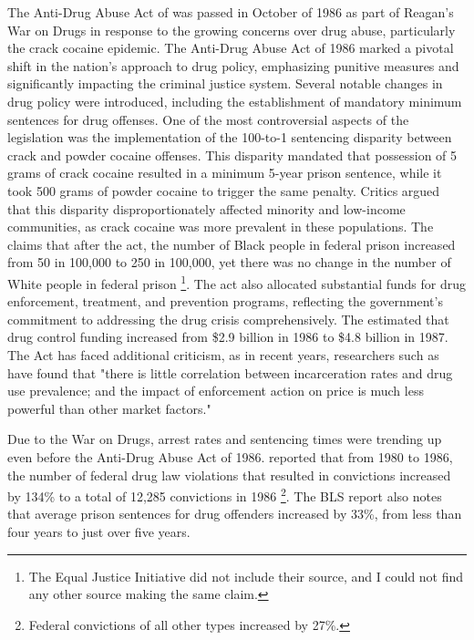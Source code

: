 \documentclass{article}
\begin{document}
The Anti-Drug Abuse Act of \citeyear{antidrugabuseact1986} was passed in October of 1986 as part of Reagan's War on Drugs in response to the growing concerns over drug abuse, particularly the crack cocaine epidemic. The Anti-Drug Abuse Act of 1986 marked a pivotal shift in the nation's approach to drug policy, emphasizing punitive measures and significantly impacting the criminal justice system. Several notable changes in drug policy were introduced, including the establishment of mandatory minimum sentences for drug offenses. One of the most controversial aspects of the legislation was the implementation of the 100-to-1 sentencing disparity between crack and powder cocaine offenses. This disparity mandated that possession of 5 grams of crack cocaine resulted in a minimum 5-year prison sentence, while it took 500 grams of powder cocaine to trigger the same penalty. Critics argued that this disparity disproportionately affected minority and low-income communities, as crack cocaine was more prevalent in these populations. The \cite{eji} claims that after the act, the number of Black people in federal prison increased from 50 in 100,000 to 250 in 100,000, yet there was no change in the number of White people in federal prison \footnote{The Equal Justice Initiative did not include their source, and I could not find any other source making the same claim.}. The act also allocated substantial funds for drug enforcement, treatment, and prevention programs, reflecting the government's commitment to addressing the drug crisis comprehensively. The \cite{drug_control_money} estimated that drug control funding increased from \$2.9 billion in 1986 to \$4.8 billion in 1987. The Act has faced additional criticism, as in recent years, researchers such as \cite{bewley2005incarceration} have found that "there is little correlation between incarceration rates and drug use prevalence; and the impact of enforcement action on price is much less powerful than other market factors."

Due to the War on Drugs, arrest rates and sentencing times were trending up even before the Anti-Drug Abuse Act of 1986. \cite{bjs_1986} reported that from 1980 to 1986, the number of federal drug law violations that resulted in convictions increased by 134\% to a total of 12,285 convictions in 1986 \footnote{Federal convictions of all other types increased by 27\%.}. The BLS report also notes that average prison sentences for drug offenders increased by 33\%, from less than four years to just over five years.
\end{document}
